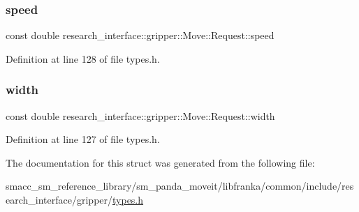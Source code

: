 \subsubsection{\texorpdfstring{speed}{speed}}
{\footnotesize\ttfamily const double research\+\_\+interface\+::gripper\+::\+Move\+::\+Request\+::speed}



Definition at line 128 of file types.\+h.

\mbox{\label{structresearch__interface_1_1gripper_1_1Move_1_1Request_a06e31cef24a449bac2ca4410898cab2f}} 
\subsubsection{\texorpdfstring{width}{width}}
{\footnotesize\ttfamily const double research\+\_\+interface\+::gripper\+::\+Move\+::\+Request\+::width}



Definition at line 127 of file types.\+h.



The documentation for this struct was generated from the following file\+:\begin{DoxyCompactItemize}
\item 
smacc\+\_\+sm\+\_\+reference\+\_\+library/sm\+\_\+panda\+\_\+moveit/libfranka/common/include/research\+\_\+interface/gripper/\hyperlink{types_8h}{types.\+h}\end{DoxyCompactItemize}
